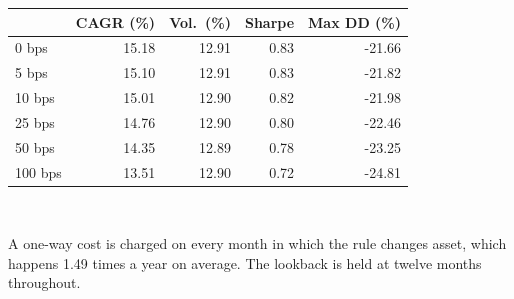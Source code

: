 \small
\begin{tabular}{lrrrr}
\toprule
 & \textbf{CAGR (\%)} & \textbf{Vol.\ (\%)} & \textbf{Sharpe} & \textbf{Max DD (\%)} \\
\midrule
0 bps & 15.18 & 12.91 & 0.83 & -21.66 \\
5 bps & 15.10 & 12.91 & 0.83 & -21.82 \\
10 bps & 15.01 & 12.90 & 0.82 & -21.98 \\
25 bps & 14.76 & 12.90 & 0.80 & -22.46 \\
50 bps & 14.35 & 12.89 & 0.78 & -23.25 \\
100 bps & 13.51 & 12.90 & 0.72 & -24.81 \\
\bottomrule
\end{tabular}
\\[0.4em]
\begin{minipage}{\linewidth}\footnotesize A one-way cost is charged on every month in which the rule changes asset, which happens 1.49 times a year on average. The lookback is held at twelve months throughout.\end{minipage}
